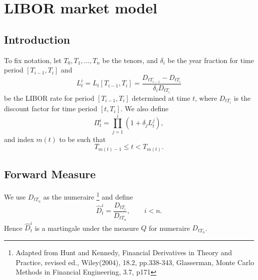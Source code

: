 \chapter{LIBOR market model}

\section{Introduction}

% 

To fix notation, let $T_0,T_1,\dots,T_n$ be the tenors, and $\delta_i$ be the 
year fraction for time period $[T_{i-1},T_i]$ and 
\begin{equation}
  L_t^i = L_t[T_{i-1},T_i] = \frac{D_{tT_{i-1}} - D_{tT_i}}{\delta_i D_{tT_i}}
\end{equation}
be the LIBOR rate for period $[T_{i-1},T_i]$ determined at time $t$, where
$D_{tT_i}$ is the discount factor for time period $[t,T_i]$. We also define
\begin{equation}
  \Pi_t^i = \prod_{j=1}^i (1+\delta_j L_t^j),
\end{equation}
and index $m(t)$ to be such that
\[
  T_{m(t)-1} \leq t < T_{m(t)}.
\]


\section{Forward Measure}
We use $D_{tT_n}$ as the numeraire 
\footnote{Adapted from Hunt and Kennedy, Financial Derivatives in Theory and
  Practice, revised ed., Wiley(2004), 18.2, pp.338-343, 
  Glasserman, Monte Carlo Methods in Financial Engineering, 3.7, p171}
and define
\begin{equation}
  \hat{D}_t^i = \frac{D_{tT_i}}{D_{tT_n}}, \qquad i<n.
\end{equation}
Hence $\hat{D}_t^i$ is a martingale under the measure $Q$ for numeraire
$D_{tT_n}$.

